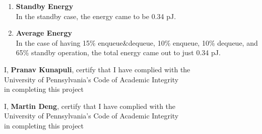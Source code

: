 \documentclass[11pt]{article}
\theoremstyle{definition}
\begin{document}
\begin{enumerate}
\begin{enumerate}
\item \textbf{Standby Energy}\\
In the standby case, the energy came to be 0.34 pJ. 

\item \textbf{Average Energy}\\
In the case of having 15\% enqueue&dequeue, 10\% enqueue, 10\% dequeue, and 65\% standby operation, the total energy came out to just 0.34 pJ.

\end{enumerate}

\begin{center}
I, \textbf{Pranav Kunapuli}, certify that I have complied with the \\
University of Pennsylvania’s Code of Academic Integrity \\
in completing this project
\end{center}

\begin{center}
I, \textbf{Martin Deng}, certify that I have complied with the \\
University of Pennsylvania’s Code of Academic Integrity \\
in completing this project
\end{center}

\end{enumerate}
\end{document}
